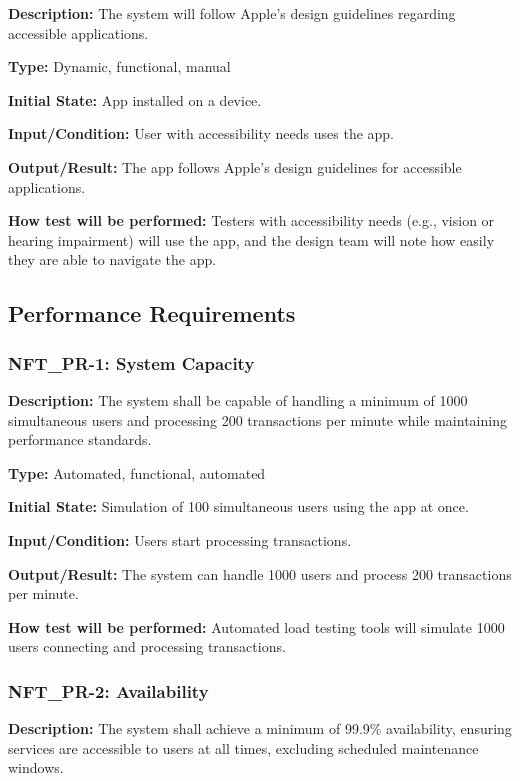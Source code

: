 \documentclass[12pt, titlepage]{article}
\begin{document}
\textbf{Description: }The system will follow Apple’s design guidelines regarding accessible applications.

\textbf{Type:} Dynamic, functional, manual

\textbf{Initial State:} App installed on a device.

\textbf{Input/Condition: }User with accessibility needs uses the app.

\textbf{Output/Result: }The app follows Apple’s design guidelines for accessible applications.

\textbf{How test will be performed:} Testers with accessibility needs (e.g., vision or hearing impairment) will use the app, and the design team will note how easily they are able to navigate the app. 
\newline
\subsection{Performance Requirements}


\subsubsection*{\textbf{NFT\_PR-1: System Capacity}
}

\textbf{Description: }The system shall be capable of handling a minimum of 1000 simultaneous users and processing 200 transactions per minute while maintaining performance standards.

\textbf{Type: }Automated, functional, automated

\textbf{Initial State:} Simulation of 100 simultaneous users using the app at once. 

\textbf{Input/Condition: }Users start processing transactions.

\textbf{Output/Result:} The system can handle 1000 users and process 200 transactions per minute.

\textbf{How test will be performed:} Automated load testing tools will simulate 1000 users connecting and processing transactions.


\subsubsection*{\textbf{NFT\_PR-2: Availability}
}

\textbf{Description: }The system shall achieve a minimum of 99.9\% availability, ensuring services are accessible to users at all times, excluding scheduled maintenance windows.
\end{document}
